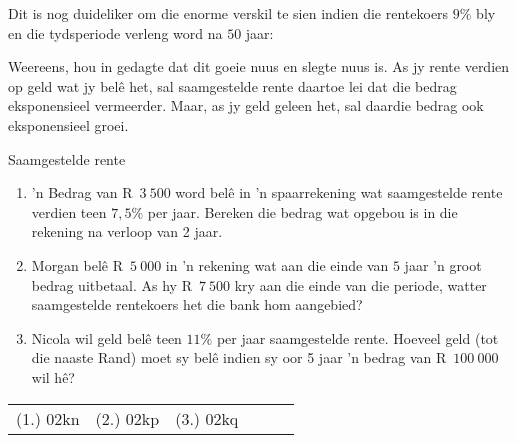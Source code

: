 Dit is nog duideliker om die enorme verskil te sien indien die rentekoers $9\%$ bly en die tydsperiode verleng word na $50$ jaar:\\

\begin{figure}[H]
    \begin{center}
	\label{FG:fig:SI10}
    \end{center}
\end{figure}
\clearpage
Weereens, hou in gedagte dat dit goeie nuus en slegte nuus is. As jy rente verdien op geld wat jy belê het,
sal saamgestelde rente daartoe lei dat die bedrag eksponensieel vermeerder. Maar, as jy geld geleen het, sal
daardie bedrag ook eksponensieel groei.


\begin{exercises}{Saamgestelde rente}
{
    \begin{enumerate}[label=\textbf{\arabic*}.]
	\item ’n Bedrag van R~$3~500$ word belê in ’n spaarrekening wat saamgestelde rente verdien teen $7,5\%$ per jaar.
Bereken die bedrag wat opgebou is in die rekening na verloop van 2 jaar.

	\item Morgan bel\^e R~$5~000$ in 'n rekening wat aan die einde van $5$ jaar 'n groot bedrag uitbetaal. As hy R~$7~500$ kry aan die einde van die periode, watter saamgestelde rentekoers het die bank hom aangebied?

	\item Nicola wil geld belê teen  $11\%$ per jaar saamgestelde rente. Hoeveel geld (tot die naaste Rand) moet sy belê
indien sy oor 5 jaar ’n bedrag van R~$100~000$ wil hê?
    \end{enumerate}

\par \practiceinfo
\par \begin{tabular}[h]{cccccc}
(1.)	02kn	&
(2.)	02kp	&
(3.)	02kq	&
\end{tabular}
}
\end{exercises}




